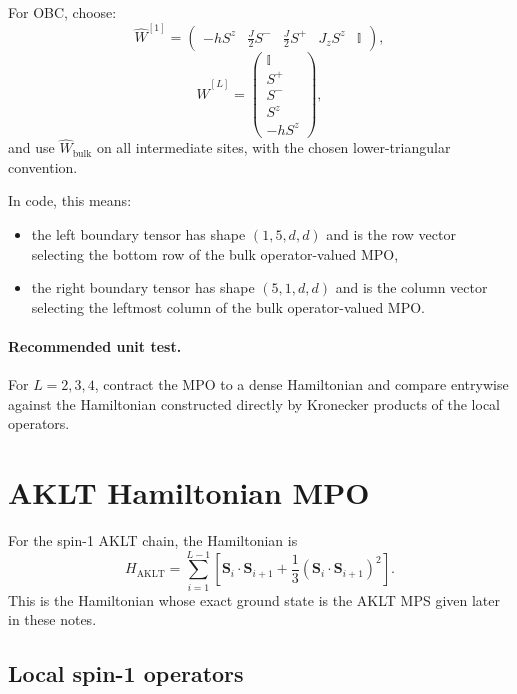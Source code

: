 \documentclass[aps,prb,onecolumn,nofootinbib]{revtex4-2}
\newcommand{\Id}{\mathbb{I}}
\begin{document}
	For OBC, choose:
	\begin{equation}
		\hat W^{[1]} =
		\begin{pmatrix}
			-hS^z & \frac{J}{2}S^- & \frac{J}{2}S^+ & J_z S^z & \Id
		\end{pmatrix},
	\end{equation}
	\begin{equation}
		\hat W^{[L]} =
		\begin{pmatrix}
			\Id \\ S^+ \\ S^- \\ S^z \\ -hS^z
		\end{pmatrix},
	\end{equation}
	and use $\hat W_{\mathrm{bulk}}$ on all intermediate sites, with the chosen lower-triangular convention.
	
	In code, this means:
	\begin{itemize}
		\item the left boundary tensor has shape $(1,5,d,d)$ and is the row vector selecting the bottom row of the bulk operator-valued MPO,
		\item the right boundary tensor has shape $(5,1,d,d)$ and is the column vector selecting the leftmost column of the bulk operator-valued MPO.
	\end{itemize}
	
	\paragraph{Recommended unit test.}
	For $L=2,3,4$, contract the MPO to a dense Hamiltonian and compare entrywise against the Hamiltonian constructed directly by Kronecker products of the local operators.
	
	\section{AKLT Hamiltonian MPO}
	
	For the spin-1 AKLT chain, the Hamiltonian is
	\begin{equation}
		H_{\mathrm{AKLT}}
		=
		\sum_{i=1}^{L-1}
		\left[
		\mathbf S_i\cdot \mathbf S_{i+1}
		+
		\frac13\left(\mathbf S_i\cdot \mathbf S_{i+1}\right)^2
		\right].
		\label{eq:aklt-hamiltonian}
	\end{equation}
	This is the Hamiltonian whose exact ground state is the AKLT MPS given later in these notes.
	
	\subsection{Local spin-1 operators}
	
\end{document}

